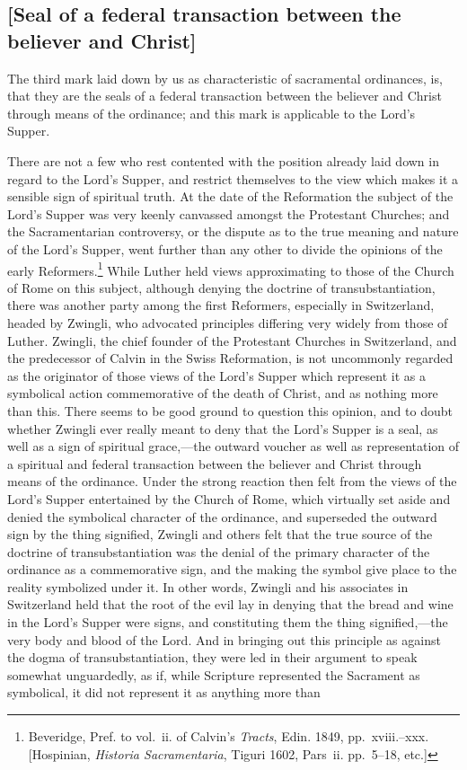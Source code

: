 \documentclass[
]{book}
\begin{document}
\hypertarget{seal-of-a-federal-transaction-between-the-believer-and-christ}{%
\subsection{{[}Seal of a federal transaction between the believer and Christ{]}}\label{seal-of-a-federal-transaction-between-the-believer-and-christ}}

The third mark laid down by us as characteristic of sacramental ordinances, is, that they are the seals of a federal transaction between the believer and Christ through means of the ordinance; and this mark is applicable to the Lord's Supper.

There are not a few who rest contented with the position already laid down in regard to the Lord's Supper, and restrict themselves to the view which makes it a sensible sign of spiritual truth. At the date of the Reformation the subject of the Lord's Supper was very keenly canvassed amongst the Protestant Churches; and the Sacramentarian controversy, or the dispute as to the true meaning and nature of the Lord's Supper, went further than any other to divide the opinions of the early Reformers.\footnote{Beveridge, Pref. to vol.~ii. of Calvin's \emph{Tracts}, Edin. 1849, pp.~xviii.--xxx. {[}Hospinian, \emph{Historia Sacramentaria}, Tiguri 1602, Pars~ii. pp.~5--18, etc.{]}} While Luther held views approximating to those of the Church of Rome on this subject, although denying the doctrine of transubstantiation, there was another party among the first Reformers, especially in Switzerland, headed by Zwingli, who advocated principles differing very widely from those of Luther. Zwingli, the chief founder of the Protestant Churches in Switzerland, and the predecessor of Calvin in the Swiss Reformation, is not uncommonly regarded as the originator of those views of the Lord's Supper which represent it as a symbolical action commemorative of the death of Christ, and as nothing more than this. There seems to be good ground to question this opinion, and to doubt whether Zwingli ever really meant to deny that the Lord's Supper is a seal, as well as a sign of spiritual grace,---the outward voucher as well as representation of a spiritual and federal transaction between the believer and Christ through means of the ordinance. Under the strong reaction then felt from the views of the Lord's Supper entertained by the Church of Rome, which virtually set aside and denied the symbolical character of the ordinance, and superseded the outward sign by the thing signified, Zwingli and others felt that the true source of the doctrine of transubstantiation was the denial of the primary character of the ordinance as a commemorative sign, and the making the symbol give place to the reality symbolized under it. In other words, Zwingli and his associates in Switzerland held that the root of the evil lay in denying that the bread and wine in the Lord's Supper were signs, and constituting them the thing signified,---the very body and blood of the Lord. And in bringing out this principle as against the dogma of transubstantiation, they were led in their argument to speak somewhat unguardedly, as if, while Scripture represented the Sacrament as symbolical, it did not represent it as anything more than 
\end{document}
